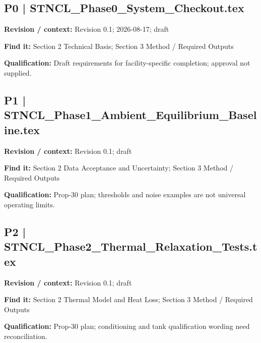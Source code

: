 \documentclass[11pt]{article}
\begin{document}
\par\noindent\begin{minipage}{\textwidth}\small
\subsection*{P0 | STNCL\_\allowbreak{}Phase0\_\allowbreak{}System\_\allowbreak{}Checkout.tex}
\textbf{Revision / context:} Revision 0.1; 2026-08-17; draft\par
\textbf{Find it:} Section 2 Technical Basis; Section 3 Method / Required Outputs\par
\textbf{Qualification:} Draft requirements for facility-specific completion; approval not supplied.\par
\end{minipage}\par\vspace{5pt}
\par\noindent\begin{minipage}{\textwidth}\small
\subsection*{P1 | STNCL\_\allowbreak{}Phase1\_\allowbreak{}Ambient\_\allowbreak{}Equilibrium\_\allowbreak{}Baseline.tex}
\textbf{Revision / context:} Revision 0.1; draft\par
\textbf{Find it:} Section 2 Data Acceptance and Uncertainty; Section 3 Method / Required Outputs\par
\textbf{Qualification:} Prop-30 plan; thresholds and noise examples are not universal operating limits.\par
\end{minipage}\par\vspace{5pt}
\par
\par\noindent\begin{minipage}{\textwidth}\small
\subsection*{P2 | STNCL\_\allowbreak{}Phase2\_\allowbreak{}Thermal\_\allowbreak{}Relaxation\_\allowbreak{}Tests.tex}
\textbf{Revision / context:} Revision 0.1; draft\par
\textbf{Find it:} Section 2 Thermal Model and Heat Loss; Section 3 Method / Required Outputs\par
\textbf{Qualification:} Prop-30 plan; conditioning and tank qualification wording need reconciliation.\par
\end{minipage}\par\vspace{5pt}
\end{document}
